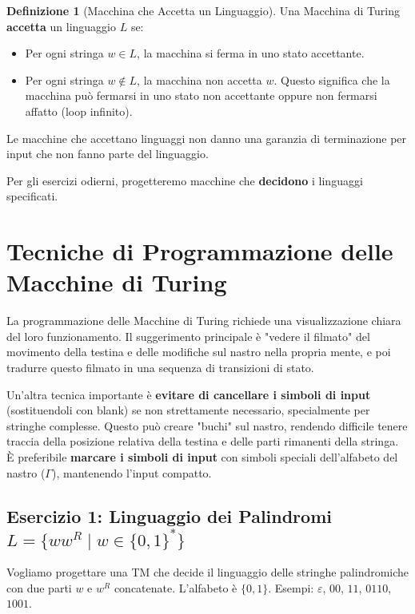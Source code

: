 \documentclass[a4paper]{article}
\theoremstyle{definition} %
\newtheorem{definition}{Definizione}
\begin{document}
\begin{definition}[Macchina che Accetta un Linguaggio]
Una Macchina di Turing \textbf{accetta} un linguaggio $L$ se:
\begin{itemize}
    \item Per ogni stringa $w \in L$, la macchina si ferma in uno stato accettante.
    \item Per ogni stringa $w \notin L$, la macchina non accetta $w$. Questo significa che la macchina può fermarsi in uno stato non accettante oppure non fermarsi affatto (loop infinito).
\end{itemize}
Le macchine che accettano linguaggi non danno una garanzia di terminazione per input che non fanno parte del linguaggio.

Per gli esercizi odierni, progetteremo macchine che \textbf{decidono} i linguaggi specificati.
\end{definition}

\section{Tecniche di Programmazione delle Macchine di Turing}

La programmazione delle Macchine di Turing richiede una visualizzazione chiara del loro funzionamento. Il suggerimento principale è "vedere il filmato" del movimento della testina e delle modifiche sul nastro nella propria mente, e poi tradurre questo filmato in una sequenza di transizioni di stato.

Un'altra tecnica importante è \textbf{evitare di cancellare i simboli di input} (sostituendoli con blank) se non strettamente necessario, specialmente per stringhe complesse. Questo può creare "buchi" sul nastro, rendendo difficile tenere traccia della posizione relativa della testina e delle parti rimanenti della stringa. È preferibile \textbf{marcare i simboli di input} con simboli speciali dell'alfabeto del nastro ($\Gamma$), mantenendo l'input compatto.

\subsection{Esercizio 1: Linguaggio dei Palindromi $L = \{ww^R \mid w \in \{0,1\}^*\}$}

Vogliamo progettare una TM che decide il linguaggio delle stringhe palindromiche con due parti $w$ e $w^R$ concatenate. L'alfabeto è $\{0,1\}$. Esempi: $\varepsilon$, $00$, $11$, $0110$, $1001$.
\end{document}
